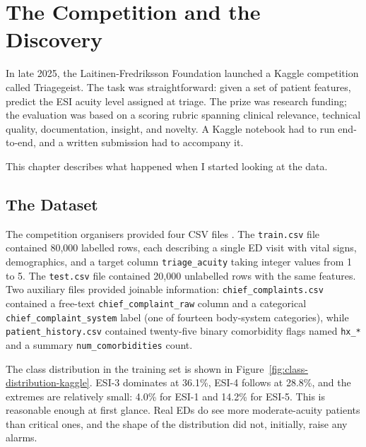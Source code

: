 
\chapter{The Competition and the Discovery}
\label{ch:discovery}

In late 2025, the Laitinen-Fredriksson Foundation launched a Kaggle competition called Triagegeist. The task was straightforward: given a set of patient features, predict the ESI acuity level assigned at triage. The prize was research funding; the evaluation was based on a scoring rubric spanning clinical relevance, technical quality, documentation, insight, and novelty. A Kaggle notebook had to run end-to-end, and a written submission had to accompany it.

This chapter describes what happened when I started looking at the data.

\section{The Dataset}

The competition organisers provided four CSV files \citep{triagegeist2025}. The \texttt{train.csv} file contained 80,000 labelled rows, each describing a single ED visit with vital signs, demographics, and a target column \texttt{triage\_acuity} taking integer values from 1 to 5. The \texttt{test.csv} file contained 20,000 unlabelled rows with the same features. Two auxiliary files provided joinable information: \texttt{chief\_complaints.csv} contained a free-text \texttt{chief\_complaint\_raw} column and a categorical \texttt{chief\_complaint\_system} label (one of fourteen body-system categories), while \texttt{patient\_history.csv} contained twenty-five binary comorbidity flags named \texttt{hx\_*} and a summary \texttt{num\_comorbidities} count.

The class distribution in the training set is shown in Figure~\ref{fig:class-distribution-kaggle}. ESI-3 dominates at 36.1\%, ESI-4 follows at 28.8\%, and the extremes are relatively small: 4.0\% for ESI-1 and 14.2\% for ESI-5. This is reasonable enough at first glance. Real EDs do see more moderate-acuity patients than critical ones, and the shape of the distribution did not, initially, raise any alarms.

